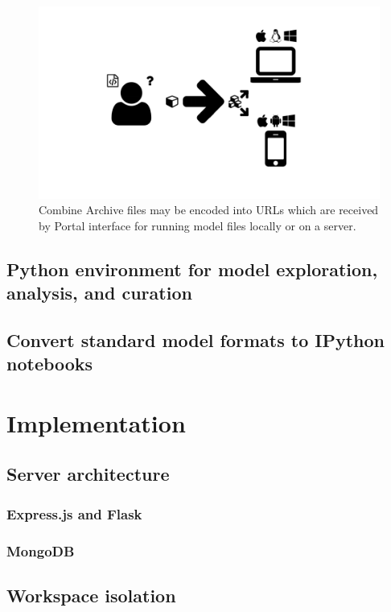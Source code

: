 \begin{figure}
  \centering
  \includegraphics[width=\textwidth,page=14,trim=0.37cm .65cm 0.37cm 0.3cm, clip=true]{images/Figures.pdf}
  \caption{Combine Archive files may be encoded into URLs which are received by Portal interface for running model files locally or on a server.}
  \label{Figure:carbon-combine-archive}
\end{figure}

\subsection{Python environment for model exploration, analysis, and curation}
\subsection{Convert standard model formats to IPython notebooks}


\section{Implementation}
\subsection{Server architecture}
\subsubsection{Express.js and Flask}
\subsubsection{MongoDB}
\subsection{Workspace isolation}
